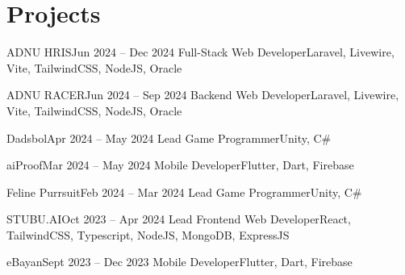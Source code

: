 \section{Projects}
\resumeSubHeadingListStart

    \resumeSubheading
    {ADNU HRIS}{Jun 2024 -- Dec 2024}
    {Full-Stack Web Developer}{Laravel, Livewire, Vite, TailwindCSS, NodeJS, Oracle}
    \resumeItemListStart
        \resumeItem{}
    \resumeItemListEnd

    \resumeSubheading
    {ADNU RACER}{Jun 2024 -- Sep 2024}
    {Backend Web Developer}{Laravel, Livewire, Vite, TailwindCSS, NodeJS, Oracle}
    \resumeItemListStart
        \resumeItem{}
    \resumeItemListEnd

    \resumeSubheading
    {Dadsbol}{Apr 2024 -- May 2024}
    {Lead Game Programmer}{Unity, C\#}
    \resumeItemListStart
        \resumeItem{}
    \resumeItemListEnd

    \resumeSubheading
    {aiProof}{Mar 2024 -- May 2024}
    {Mobile Developer}{Flutter, Dart, Firebase}
    \resumeItemListStart
        \resumeItem{}
    \resumeItemListEnd

    \resumeSubheading
    {Feline Purrsuit}{Feb 2024 -- Mar 2024}
    {Lead Game Programmer}{Unity, C\#}
    \resumeItemListStart
        \resumeItem{}
    \resumeItemListEnd

    \resumeSubheading
    {STUBU.AI}{Oct 2023 -- Apr 2024}
    {Lead Frontend Web Developer}{React, TailwindCSS, Typescript, NodeJS, MongoDB, ExpressJS}
    \resumeItemListStart
    \resumeItemListEnd

    \resumeSubheading
    {eBayan}{Sept 2023 -- Dec 2023}
    {Mobile Developer}{Flutter, Dart, Firebase}
    \resumeItemListStart
    \resumeItemListEnd

\resumeSubHeadingListEnd